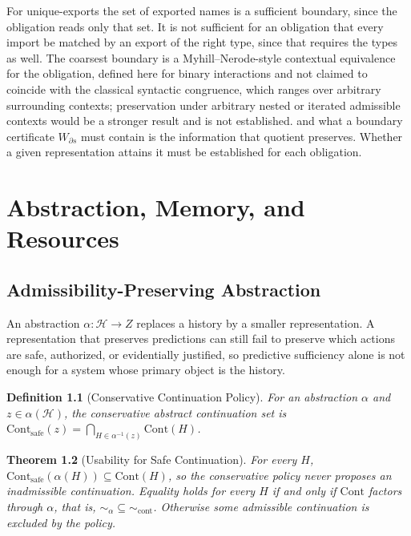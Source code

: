 \documentclass[12pt,oneside,openany]{book}
\theoremstyle{spherepop}
\newtheorem{definition}{Definition}[chapter]
\newtheorem{theorem}[definition]{Theorem}
\theoremstyle{remarkstyle}
\newcommand{\calH}{\mathcal{H}}
\begin{document}
For \textsf{unique-exports} the set of exported names is a sufficient boundary, since the obligation reads only that set. It is not sufficient for an obligation that every import be matched by an export of the right type, since that requires the types as well. The coarsest boundary is a Myhill--Nerode-style contextual equivalence for the obligation, defined here for binary interactions and not claimed to coincide with the classical syntactic congruence, which ranges over arbitrary surrounding contexts; preservation under arbitrary nested or iterated admissible contexts would be a stronger result and is not established. and what a boundary certificate $W_{\partial s}$ must contain is the information that quotient preserves. Whether a given representation attains it must be established for each obligation.

\part{Abstraction, Memory, and Resources}
\label{part:memory}

\chapter{Admissibility-Preserving Abstraction}
\label{ch:abstraction}

An abstraction $\alpha:\calH\to Z$ replaces a history by a smaller representation. A representation that preserves predictions can still fail to preserve which actions are safe, authorized, or evidentially justified, so predictive sufficiency alone is not enough for a system whose primary object is the history.

\begin{definition}[Conservative Continuation Policy]
For an abstraction $\alpha$ and $z\in\alpha(\calH)$, the \emph{conservative abstract continuation set} is $\mathrm{Cont}_{\mathrm{safe}}(z)=\bigcap_{H\in\alpha^{-1}(z)}\mathrm{Cont}(H)$.
\end{definition}

\begin{theorem}[Usability for Safe Continuation]
\label{thm:abstraction}
For every $H$, $\mathrm{Cont}_{\mathrm{safe}}(\alpha(H))\subseteq\mathrm{Cont}(H)$, so the conservative policy never proposes an inadmissible continuation. Equality holds for every $H$ if and only if $\mathrm{Cont}$ factors through $\alpha$, that is, ${\sim_\alpha}\subseteq{\sim_{\mathrm{cont}}}$. Otherwise some admissible continuation is excluded by the policy.
\end{theorem}
\end{document}
